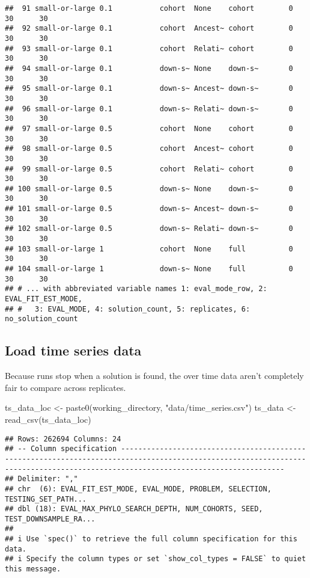 \documentclass[
]{book}
\newenvironment{Shaded}{\begin{snugshade}}{\end{snugshade}}
\newcommand{\FunctionTok}[1]{\textcolor[rgb]{0.00,0.00,0.00}{#1}}
\newcommand{\NormalTok}[1]{#1}
\newcommand{\OtherTok}[1]{\textcolor[rgb]{0.56,0.35,0.01}{#1}}
\newcommand{\StringTok}[1]{\textcolor[rgb]{0.31,0.60,0.02}{#1}}
\begin{document}
\begin{verbatim}
##  91 small-or-large 0.1           cohort  None    cohort        0      30      30
##  92 small-or-large 0.1           cohort  Ancest~ cohort        0      30      30
##  93 small-or-large 0.1           cohort  Relati~ cohort        0      30      30
##  94 small-or-large 0.1           down-s~ None    down-s~       0      30      30
##  95 small-or-large 0.1           down-s~ Ancest~ down-s~       0      30      30
##  96 small-or-large 0.1           down-s~ Relati~ down-s~       0      30      30
##  97 small-or-large 0.5           cohort  None    cohort        0      30      30
##  98 small-or-large 0.5           cohort  Ancest~ cohort        0      30      30
##  99 small-or-large 0.5           cohort  Relati~ cohort        0      30      30
## 100 small-or-large 0.5           down-s~ None    down-s~       0      30      30
## 101 small-or-large 0.5           down-s~ Ancest~ down-s~       0      30      30
## 102 small-or-large 0.5           down-s~ Relati~ down-s~       0      30      30
## 103 small-or-large 1             cohort  None    full          0      30      30
## 104 small-or-large 1             down-s~ None    full          0      30      30
## # ... with abbreviated variable names 1: eval_mode_row, 2: EVAL_FIT_EST_MODE,
## #   3: EVAL_MODE, 4: solution_count, 5: replicates, 6: no_solution_count
\end{verbatim}

\hypertarget{load-time-series-data}{%
\subsection{Load time series data}\label{load-time-series-data}}

Because runs stop when a solution is found, the over time data aren't completely fair to compare across replicates.

\begin{Shaded}
\begin{Highlighting}[]
\NormalTok{ts\_data\_loc }\OtherTok{\textless{}{-}} \FunctionTok{paste0}\NormalTok{(working\_directory, }\StringTok{"data/time\_series.csv"}\NormalTok{)}
\NormalTok{ts\_data }\OtherTok{\textless{}{-}} \FunctionTok{read\_csv}\NormalTok{(ts\_data\_loc)}
\end{Highlighting}
\end{Shaded}

\begin{verbatim}
## Rows: 262694 Columns: 24
## -- Column specification ----------------------------------------------------------------------------------------------------------------------------------------------------------------------------------
## Delimiter: ","
## chr  (6): EVAL_FIT_EST_MODE, EVAL_MODE, PROBLEM, SELECTION, TESTING_SET_PATH...
## dbl (18): EVAL_MAX_PHYLO_SEARCH_DEPTH, NUM_COHORTS, SEED, TEST_DOWNSAMPLE_RA...
## 
## i Use `spec()` to retrieve the full column specification for this data.
## i Specify the column types or set `show_col_types = FALSE` to quiet this message.
\end{verbatim}
\end{document}
